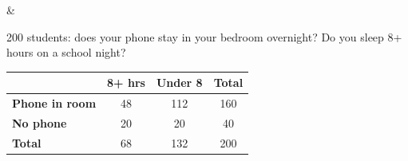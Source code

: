 \documentclass[12pt]{article}
\begin{document}
\begin{guidednotes}
 &
\begin{minipage}[c]{0.40\linewidth}\raggedright
200 students: does your phone stay in your bedroom overnight? Do you sleep 8+ hours on a
school night?
\end{minipage}\hfill
\begin{minipage}[c]{0.58\linewidth}
\centering\footnotesize
\setlength{\tabcolsep}{3pt}\renewcommand{\arraystretch}{1.15}
\begin{tabular}{@{} l | c c | c @{}}
 & \textbf{8+ hrs} & \textbf{Under 8} & \textbf{Total} \\ \hline
\textbf{Phone in room} & 48 & 112 & 160 \\
\textbf{No phone} & 20 & 20 & 40 \\ \hline
\textbf{Total} & 68 & 132 & 200 \\
\end{tabular}
\end{minipage}


\end{guidednotes}
\end{document}
